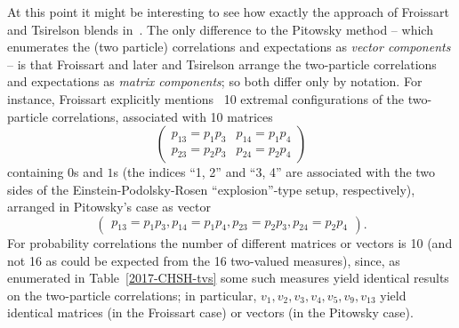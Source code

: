 At this point it might be interesting to see how exactly the approach of  Froissart and Tsirelson blends in~\cite{froissart-81,cirelson}.
The only difference to the Pitowsky method -- which enumerates the (two particle) correlations and expectations as {\em vector components} --
is that
Froissart and later  and Tsirelson arrange the two-particle correlations and expectations as {\em matrix components};
so both differ only by notation.
For instance, Froissart explicitly mentions~\cite[pp.~242,243]{froissart-81} 10 extremal configurations of the two-particle correlations,
associated with 10 matrices
\begin{equation}
\begin{pmatrix}p_{13}=p_1p_3 &p_{14}=p_1p_4 \\p_{23}=p_2p_3 &p_{24}=p_2p_4 \end{pmatrix}
\end{equation}
containing $0$s and $1$s
(the indices ``1, 2'' and ``3, 4'' are associated with the two sides of the Einstein-Podolsky-Rosen ``explosion''-type setup, respectively),
arranged in Pitowsky's case as vector
\begin{equation}
\begin{pmatrix}p_{13}=p_1p_3, p_{14}=p_1p_4, p_{23}=p_2p_3, p_{24}=p_2p_4 \end{pmatrix}.
\end{equation}
For probability correlations the number of different matrices or vectors is 10 (and not 16 as could be expected from the 16 two-valued measures),
since, as enumerated in Table~\ref{2017-CHSH-tvs} some such measures yield identical results on the two-particle correlations; in particular,
$v_1, v_2, v_3, v_4, v_5, v_9, v_{13}$  yield identical matrices (in the Froissart case) or vectors (in the Pitowsky case).
